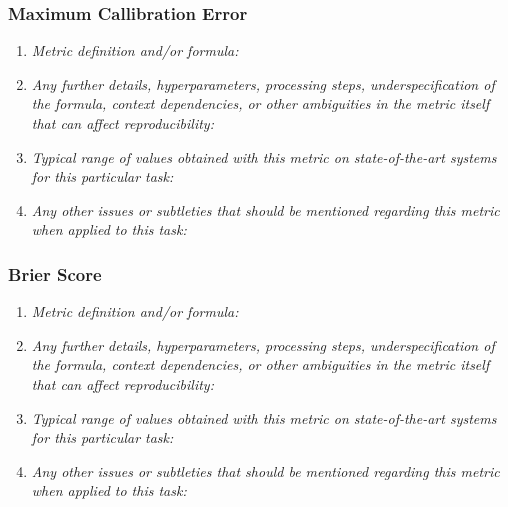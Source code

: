 \documentclass[a4paper,11pt]{article}
\begin{document}
        \subsubsection{Maximum Callibration Error}
            \begin{enumerate}[label=\alph*.]
                \item \textit{Metric definition and/or formula:}
                \bigskip
                \item \textit{Any further details, hyperparameters, processing steps, underspecification of the formula, context dependencies, or other ambiguities in the metric itself that can affect reproducibility:}
                \bigskip
                \item \textit{Typical range of values obtained with this metric on state-of-the-art systems for this particular task:}
                \bigskip
                \item \textit{Any other issues or subtleties that should be mentioned regarding this metric when applied to this task:}
                \bigskip
            \end{enumerate}
        \subsubsection{Brier Score}
            \begin{enumerate}[label=\alph*.]
                \item \textit{Metric definition and/or formula:}
                \bigskip
                \item \textit{Any further details, hyperparameters, processing steps, underspecification of the formula, context dependencies, or other ambiguities in the metric itself that can affect reproducibility:}
                \bigskip
                \item \textit{Typical range of values obtained with this metric on state-of-the-art systems for this particular task:}
                \bigskip
                \item \textit{Any other issues or subtleties that should be mentioned regarding this metric when applied to this task:}
                \bigskip
            \end{enumerate}
\end{document}
